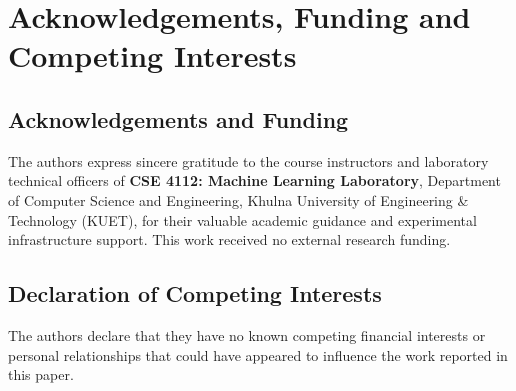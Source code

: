 \documentclass[11pt,a4paper]{article}
\begin{document}
\section{Acknowledgements, Funding and Competing Interests}

\subsection{Acknowledgements and Funding}
The authors express sincere gratitude to the course instructors and laboratory technical officers of \textbf{CSE 4112: Machine Learning Laboratory}, Department of Computer Science and Engineering, Khulna University of Engineering \& Technology (KUET), for their valuable academic guidance and experimental infrastructure support. This work received no external research funding.

\subsection{Declaration of Competing Interests}
The authors declare that they have no known competing financial interests or personal relationships that could have appeared to influence the work reported in this paper.

\end{document}
